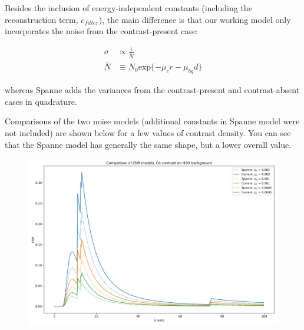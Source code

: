 \documentclass[11pt]{article}
\begin{document}
Besides the inclusion of energy-independent constants (including the reconstruction term, \(c_{filter}\)), the main 
difference is that our working model only incorporates the noise from the contrast-present case:

\begin{align}
  \sigma  &\propto \frac{1}{\bar{N}} \\
  \bar{N} &\equiv N_0 \text{exp}\{-\mu_c r - \mu_{bg} d\}
\end{align}  

whereas Spanne adds the variances from the contrast-present and contrast-absent cases in quadrature.

Comparisons of the two noise models (additional constants in Spanne model were not included) are shown below for a few values of contrast density. You can see that the Spanne model has generally the same shape,
but a lower overall value.

\begin{figure}[t]
  \includegraphics[width=\linewidth]{comparison}
\end{figure}
\end{document}
